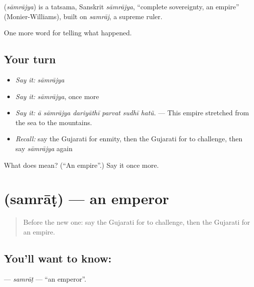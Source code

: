 \begin{cousinweb}
\textbf{} (\emph{sāmrājya}) is a tatsama, Sanskrit \emph{sāmrājya}, \textquotedblleft{}complete sovereignty, an empire\textquotedblright{} (Monier-Williams), built on \emph{samrāj}, a supreme ruler.
\end{cousinweb}

\begin{grammarlens}[title={What you've built}]
One more word for telling what happened.
\end{grammarlens}

\subsection*{Your turn}
\begin{itemize}
\raggedright
  \item \emph{Say it:} \emph{sāmrājya}
  \item \emph{Say it:} \emph{sāmrājya}, once more
  \item \emph{Say it:} \emph{ā sāmrājya dariyāthī parvat sudhī hatũ.} — This empire stretched from the sea to the mountains.
  \item \emph{Recall:} say the Gujarati for enmity, then the Gujarati for to challenge, then say \emph{sāmrājya} again
\end{itemize}

\begin{tcolorbox}[breakable,colback=teal!4,colframe=teal!35!black,title={Before you move on}]
What does  mean? (\textquotedblleft{}An empire\textquotedblright{}.) Say it once more.
\end{tcolorbox}
\section[\texorpdfstring{\gu{સમ્રાટ} (samrāṭ)}{સમ્રાટ (samrāṭ)}]{ (samrāṭ) — an emperor}

\label{lesson:GU-C324-samrat}



\begin{quote}
Before the new one: say the Gujarati for to challenge, then the Gujarati for an empire.
\end{quote}

\subsection*{You'll want to know: }
\textbf{} — \emph{samrāṭ} — \textquotedblleft{}an emperor\textquotedblright{}.

